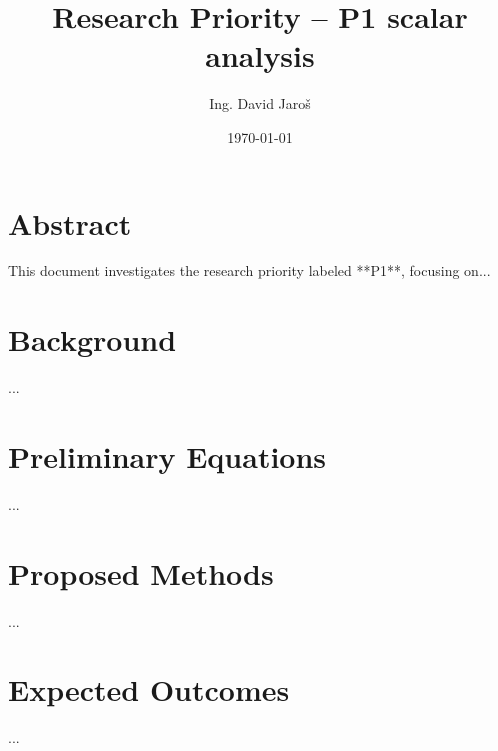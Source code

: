 \documentclass[12pt]{article}
\title{Research Priority – P1 scalar analysis}
\author{Ing. David Jaroš}
\date{\today}
\begin{document}
\maketitle

\section*{Abstract}
This document investigates the research priority labeled **P1**, focusing on...

\section*{Background}
...

\section*{Preliminary Equations}
...

\section*{Proposed Methods}
...

\section*{Expected Outcomes}
...
\end{document}
